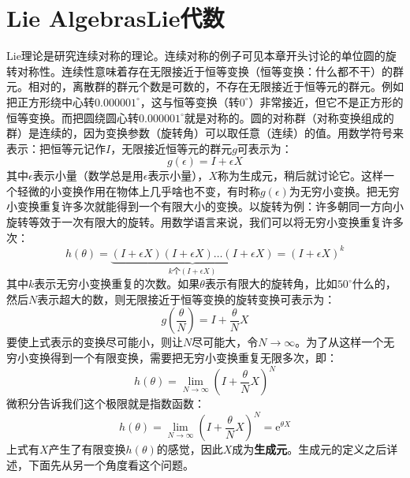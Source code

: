 \section[Lie代数]{Lie Algebras\quad Lie代数}
\label{sec3.4}
Lie理论是研究连续对称的理论。连续对称的例子可见本章开头讨论的单位圆的旋转对称性。连续性意味着存在无限接近于恒等变换（恒等变换：什么都不干）的群元。相对的，离散群的群元个数是可数的，不存在无限接近于恒等元的群元。例如把正方形绕中心转$0.000001^\circ$，这与恒等变换（转$0^\circ$）非常接近，但它不是正方形的恒等变换。而把圆绕圆心转$0.000001^\circ$就是对称的。圆的对称群（对称变换组成的群）是连续的，因为变换参数（旋转角）可以取任意（连续）的值。用数学符号来表示：把恒等元记作$I$，无限接近恒等元的群元$g$可表示为：
\begin{equation}
\label{equ3.48}
g(\epsilon) = I + \epsilon X
\end{equation}
其中$\epsilon$表示小量（数学总是用$\epsilon$表示小量），$X$称为生成元，稍后就讨论它。这样一个轻微的小变换作用在物体上几乎啥也不变，有时称$g(\epsilon)$为无穷小变换。把无穷小变换重复许多次就能得到一个有限大小的变换。以旋转为例：许多朝同一方向小旋转等效于一次有限大的旋转。用数学语言来说，我们可以将无穷小变换重复许多次：
\begin{equation}
\label{equ3.49}
h(\theta) = \underbrace{(I + \epsilon X)(I + \epsilon X) \dots (I + \epsilon X)}_{k\text{个}(I + \epsilon X)} = (I + \epsilon X)^k
\end{equation}
其中$k$表示无穷小变换重复的次数。如果$\theta$表示有限大的旋转角，比如$50^\circ$什么的，然后$N$表示超大的数，则无限接近于恒等变换的旋转变换可表示为：
\begin{equation}
\label{equ3.50}
g(\frac{\theta}{N}) = I + \frac{\theta}{N} X
\end{equation}
要使上式表示的变换尽可能小，则让$N$尽可能大，令$N \rightarrow \infty$。为了从这样一个无穷小变换得到一个有限变换，需要把无穷小变换重复无限多次，即：
\begin{equation}
\label{equ3.51}
h(\theta) = \lim_{N \rightarrow \infty} \left( I + \frac{\theta}{N}X \right)^N
\end{equation}
微积分告诉我们这个极限就是指数函数：
\begin{equation}
\label{equ3.52}
h(\theta) = \lim_{N \rightarrow \infty} \left( I + \frac{\theta}{N}X \right)^N = \mathrm{e}^{\theta X}
\end{equation}
上式有$X$产生了有限变换$h(\theta)$的感觉，因此$X$成为{\bf 生成元}。生成元的定义之后详述，下面先从另一个角度看这个问题。


